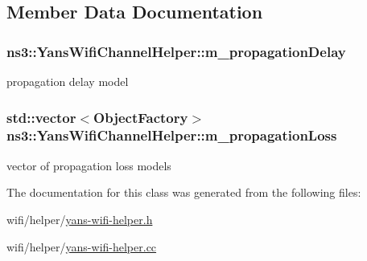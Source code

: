 \subsection{Member Data Documentation}
\subsubsection[{\texorpdfstring{m\+\_\+propagation\+Delay}{m_propagationDelay}}]{ ns3\+::\+Yans\+Wifi\+Channel\+Helper\+::m\+\_\+propagation\+Delay\hspace{0.3cm}{\ttfamily [private]}}\hypertarget{classns3_1_1YansWifiChannelHelper_a0043ccd4e1b107c5e34028afe195dc14}{}\label{classns3_1_1YansWifiChannelHelper_a0043ccd4e1b107c5e34028afe195dc14}


propagation delay model 

\subsubsection[{\texorpdfstring{m\+\_\+propagation\+Loss}{m_propagationLoss}}]{\setlength{\rightskip}{0pt plus 5cm}std\+::vector$<${\bf Object\+Factory}$>$ ns3\+::\+Yans\+Wifi\+Channel\+Helper\+::m\+\_\+propagation\+Loss\hspace{0.3cm}{\ttfamily [private]}}\hypertarget{classns3_1_1YansWifiChannelHelper_ae900d194a15cb8608999b18a906b4b34}{}\label{classns3_1_1YansWifiChannelHelper_ae900d194a15cb8608999b18a906b4b34}


vector of propagation loss models 



The documentation for this class was generated from the following files\+:\begin{DoxyCompactItemize}
\item 
wifi/helper/\hyperlink{yans-wifi-helper_8h}{yans-\/wifi-\/helper.\+h}\item 
wifi/helper/\hyperlink{yans-wifi-helper_8cc}{yans-\/wifi-\/helper.\+cc}\end{DoxyCompactItemize}
